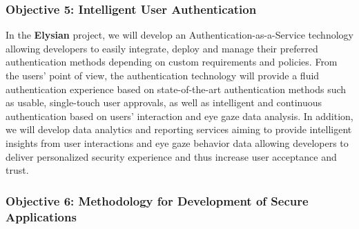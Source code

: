 \documentclass[a4paper,11pt]{article}
\newcommand{\project}[1]{\textbf{#1}\xspace}
\newcommand{\SECURITY}{\project{Elysian}}
\newcommand{\TheProject}{\SECURITY}
\begin{document}
\subsubsection*{Objective 5: Intelligent User Authentication}
\vspace{-6pt}

In the \TheProject{} project, we will develop an Authentication-as-a-Service technology allowing developers to easily integrate, deploy and manage their preferred authentication methods depending on custom requirements and policies. From the users’ point of view, the authentication technology will provide a fluid authentication experience based on state-of-the-art authentication methods such as usable, single-touch user approvals, as well as intelligent and continuous authentication based on users' interaction and eye gaze data analysis. In addition, we will develop data analytics and reporting services aiming to provide intelligent insights from user interactions and eye gaze behavior data allowing developers to deliver personalized security experience and thus increase user acceptance and trust.

\subsubsection*{Objective 6: Methodology for Development of Secure Applications}
\vspace{-6pt}
\end{document}
